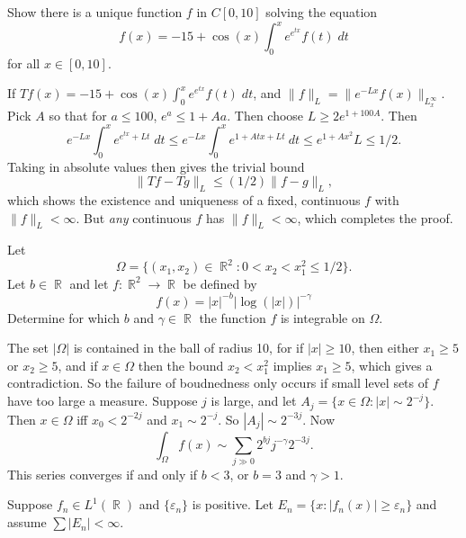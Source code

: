 \documentclass[answers]{exam}
\DeclareMathOperator{\RR}{\mathbb{R}}
\begin{document}
\begin{questions}
\question Show there is a unique function $f$ in $C[0,10]$ solving the equation
%
\[ f(x) = -15 + \cos(x) \int_0^x e^{e^{tx}} f(t)\; dt \]
%
for all $x \in [0,10]$.
\begin{solution}
	If $Tf(x) = -15 + \cos(x) \int_0^x e^{e^{tx}} f(t)\; dt$, and $\| f \|_L = \| e^{-Lx} f(x) \|_{L^\infty_x}$. Pick $A$ so that for $a \leq 100$, $e^a \leq 1 + Aa$. Then choose $L \geq 2 e^{1 + 100 A}$. Then
	\[ e^{-Lx} \int_0^x e^{e^{tx} + Lt}\; dt \leq e^{-Lx} \int_0^x e^{1 + A tx + Lt}\ dt \leq e^{1 + Ax^2}{L} \leq 1/2. \]
	Taking in absolute values then gives the trivial bound
	\[ \| Tf - Tg \|_L \leq (1/2) \| f - g \|_L, \]
	which shows the existence and uniqueness of a fixed, continuous $f$ with $\| f \|_L < \infty$. But \emph{any} continuous $f$ has $\| f \|_L < \infty$, which completes the proof.
\end{solution}

\question Let
%
\[ \Omega = \{ (x_1,x_2) \in \RR^2 : 0 < x_2 < x_1^2 \leq 1/2 \}. \]
%
Let $b \in \RR$ and let $f: \RR^2 \to \RR$ be defined by
%
\[ f(x) = |x|^{-b} |\log(|x|)|^{-\gamma} \]
%
Determine for which $b$ and $\gamma \in \RR$ the function $f$ is integrable on $\Omega$.
\begin{solution}
	The set $|\Omega|$ is contained in the ball of radius 10, for if $|x| \geq 10$, then either $x_1 \geq 5$ or $x_2 \geq 5$, and if $x \in \Omega$ then the bound $x_2 < x_1^2$ implies $x_1 \geq 5$, which gives a contradiction. So the failure of boudnedness only occurs if small level sets of $f$ have too large a measure. Suppose $j$ is large, and let $A_j = \{ x \in \Omega : |x| \sim 2^{-j} \}$. Then $x \in \Omega$ iff $x_0 < 2^{-2j}$ and $x_1 \sim 2^{-j}$. So $|A_j| \sim 2^{-3j}$. Now
	\[ \int_\Omega f(x) \sim \sum_{j \gg 0} 2^{bj} j^{-\gamma} 2^{-3j}. \]
	This series converges if and only if $b < 3$, or $b = 3$ and $\gamma > 1$.
\end{solution}

\question Suppose $f_n \in L^1(\RR)$ and $\{ \varepsilon_n \}$ is positive. Let $E_n = \{ x : |f_n(x)| \geq \varepsilon_n \}$ and assume $\sum |E_n| < \infty$.
\end{questions}
\end{document}
